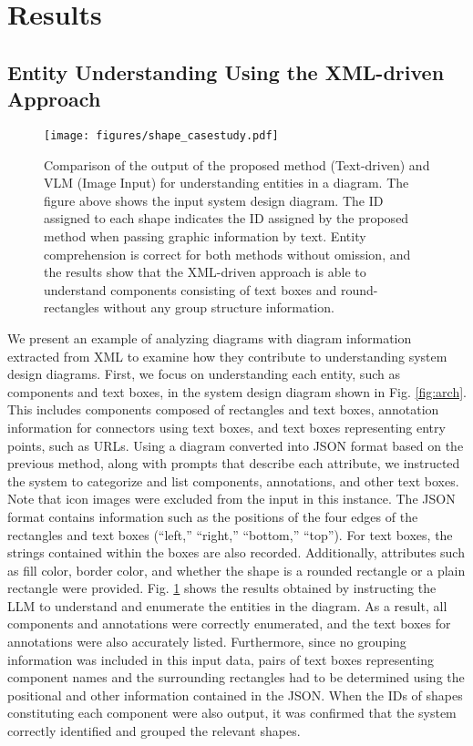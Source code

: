 \section{Results}
\label{sec:result}

\subsection{Entity Understanding Using the XML-driven Approach}
\label{sec:result1}
\begin{figure}[tbp]
    \centering
    \texttt{[image: figures/shape\_casestudy.pdf]}
    \caption{\small
    Comparison of the output of the proposed method (Text-driven) and VLM (Image Input) for understanding entities in a diagram.
The figure above shows the input system design diagram. The ID assigned to each shape indicates the ID assigned by the proposed method when passing graphic information by text. Entity comprehension is correct for both methods without omission, and the results show that the XML-driven approach is able to understand components consisting of text boxes and round-rectangles without any group structure information.
    }
    \label{fig:shape_cs}
\end{figure}

We present an example of analyzing diagrams with diagram information extracted from XML to examine how they contribute to understanding system design diagrams. First, we focus on understanding each entity, such as components and text boxes, in the system design diagram shown in Fig. \ref{fig:arch}. This includes components composed of rectangles and text boxes, annotation information for connectors using text boxes, and text boxes representing entry points, such as URLs. Using a diagram converted into JSON format based on the previous method, along with prompts that describe each attribute, we instructed the system to categorize and list components, annotations, and other text boxes. Note that icon images were excluded from the input in this instance. The JSON format contains information such as the positions of the four edges of the rectangles and text boxes (“left,” “right,” “bottom,” “top”). For text boxes, the strings contained within the boxes are also recorded. Additionally, attributes such as fill color, border color, and whether the shape is a rounded rectangle or a plain rectangle were provided. Fig. \ref{fig:shape_cs} shows the results obtained by instructing the LLM to understand and enumerate the entities in the diagram. As a result, all components and annotations were correctly enumerated, and the text boxes for annotations were also accurately listed. Furthermore, since no grouping information was included in this input data, pairs of text boxes representing component names and the surrounding rectangles had to be determined using the positional and other information contained in the JSON. When the IDs of shapes constituting each component were also output, it was confirmed that the system correctly identified and grouped the relevant shapes.


